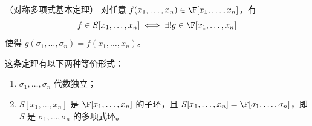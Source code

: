 \begin{theorem}（对称多项式基本定理）
	对任意 \( f(x_1,\dots,x_n) \in \F[x_1,\dots,x_n] \)，有
	\[
	f \in S[x_1,\dots,x_n] \iff \exists! g \in \F[x_1,\dots,x_n]
	\]
	使得 \( g(\sigma_1,\dots,\sigma_n) = f(x_1,\dots,x_n) \)。
	
\end{theorem}

这条定理有以下两种等价形式：
\begin{enumerate}
	\item  \( \sigma_1,\dots,\sigma_n \) 代数独立；
	\item \( S[x_1,\dots,x_n] \) 是 \( \F[x_1,\dots,x_n] \) 的子环，且 \( S[x_1,\dots,x_n] = \F[\sigma_1,\dots,\sigma_n] \)，即 \( S \) 是 \( \sigma_1,\dots,\sigma_n \) 的多项式环。
\end{enumerate}


